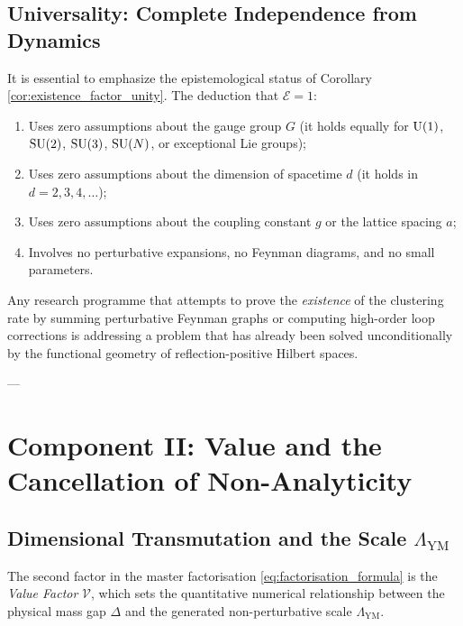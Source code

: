 \subsection{Universality: Complete Independence from Dynamics}
\label{subsec:universality_existence}

It is essential to emphasize the epistemological status of Corollary \ref{cor:existence_factor_unity}. The deduction that $\mathcal{E} = 1$:
\begin{enumerate}
    \item Uses zero assumptions about the gauge group $G$ (it holds equally for $\mathrm{U}(1)$, $\mathrm{SU}(2)$, $\mathrm{SU}(3)$, $\mathrm{SU}(N)$, or exceptional Lie groups);
    \item Uses zero assumptions about the dimension of spacetime $d$ (it holds in $d = 2, 3, 4, \dots$);
    \item Uses zero assumptions about the coupling constant $g$ or the lattice spacing $a$;
    \item Involves no perturbative expansions, no Feynman diagrams, and no small parameters.
\end{enumerate}

Any research programme that attempts to prove the \emph{existence} of the clustering rate by summing perturbative Feynman graphs or computing high-order loop corrections is addressing a problem that has already been solved unconditionally by the functional geometry of reflection-positive Hilbert spaces.

---

\section{Component II: Value and the Cancellation of Non-Analyticity}
\label{sec:factor_value}

\subsection{Dimensional Transmutation and the Scale \texorpdfstring{$\Lambda_{\mathrm{YM}}$}{Lambda_YM}}
\label{subsec:transmutation_scale_ch8}

The second factor in the master factorisation \eqref{eq:factorisation_formula} is the \emph{Value Factor} $\mathcal{V}$, which sets the quantitative numerical relationship between the physical mass gap $\Delta$ and the generated non-perturbative scale $\Lambda_{\mathrm{YM}}$.

